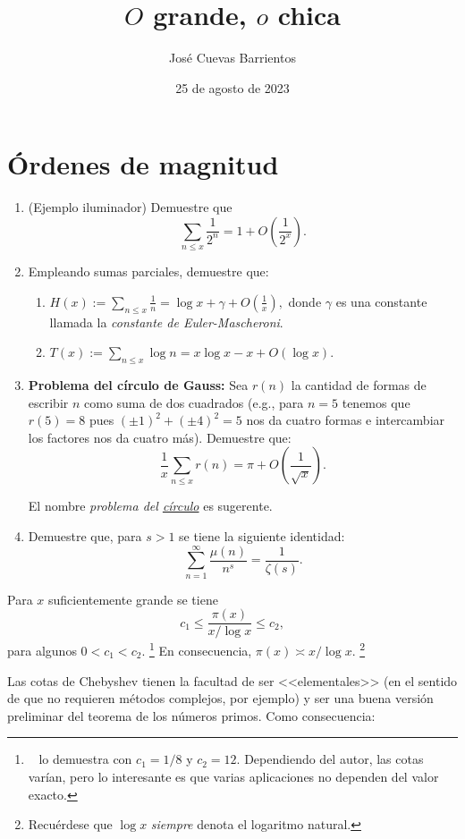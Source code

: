 \documentclass[11pt, reqno]{amsart}
\title{$O$ grande, $o$ chica}
\date{25 de agosto de 2023}
\author[José Cuevas]{José Cuevas Barrientos}
\begin{document}
\maketitle

\section{Órdenes de magnitud}
\begin{enumerate}
	\item (Ejemplo iluminador) Demuestre que
		$$ \sum_{n \le x} \frac{1}{2^n} = 1 + O\left( \frac{1}{2^x} \right). $$
	\item Empleando sumas parciales, demuestre que:
		\begin{enumerate}
			\item $\displaystyle H(x) := \sum_{n \le x} \frac{1}{n} = \log x + \gamma + O\left( \frac{1}{x} \right),$ donde $ \gamma$ es una constante
				llamada la \textit{constante de Euler-Mascheroni}.
			\item $\displaystyle T(x) := \sum_{n \le x} \log n = x\log x - x + O(\log x)$.
		\end{enumerate}

	\item \textbf{Problema del círculo de Gauss:} Sea $r(n)$ la cantidad de formas de escribir $n$ como suma de dos cuadrados
		(e.g., para $n = 5$ tenemos que $r(5) = 8$ pues $(\pm 1)^2 + (\pm 4)^2 = 5$ nos da cuatro formas e intercambiar
		los factores nos da cuatro más).
		Demuestre que:
		$$ \frac{1}{x} \sum_{n\le x} r(n) = \pi + O\left( \frac{1}{\sqrt{x}} \right). $$

		\begin{hint}
			El nombre \textit{problema del \underline{círculo}} es sugerente.
		\end{hint}
	\item Demuestre que, para $s > 1$ se tiene la siguiente identidad:
		$$ \sum_{n=1}^{\infty} \frac{\mu(n)}{n^s} = \frac{1}{\zeta(s)}. $$
\end{enumerate}

\begin{thm}
	Para $x$ suficientemente grande se tiene
	$$ c_1 \le \frac{\pi(x)}{x / \log x} \le c_2, $$
	para algunos $0 < c_1 < c_2$.%
	\footnote{\citeauthor{hua:number}~\cite[82]{hua:number} lo demuestra con $c_1 = 1/8$ y $c_2 = 12$.
	Dependiendo del autor, las cotas varían, pero lo interesante es que varias aplicaciones no dependen del valor exacto.}
	En consecuencia, $\pi(x) \asymp x/\log x$.%
	\footnote{Recuérdese que $\log x$ \textit{siempre} denota el logaritmo natural.}
\end{thm}
Las cotas de Chebyshev tienen la facultad de ser <<elementales>> (en el sentido de que no requieren métodos complejos, por ejemplo)
y ser una buena versión preliminar del teorema de los números primos.
Como consecuencia:
\end{document}
